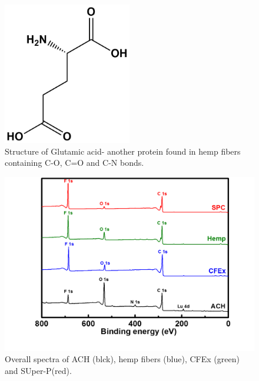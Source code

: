 \begin{figure}[tbh!]
  \centering
  \includegraphics[width=0.5\textwidth]{Figures/chap5fig/gluacid}
    \caption{Structure of Glutamic acid- another protein found in hemp fibers containing C-O, C=O and C-N bonds.}
  \label{Figures/chap5fig:gluacid}
\end{figure}
\begin{figure}[tbh!]
  \centering
  \includegraphics[width=\textwidth]{Figures/chap5fig/xpsoverall}
    \caption{Overall spectra of ACH (blck), hemp fibers (blue), CFEx (green) and SUper-P(red).}
  \label{Figures/chap5fig:xpsoverall}
\end{figure}

